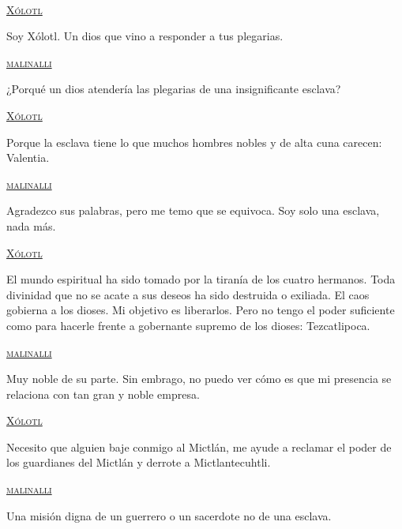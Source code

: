 \begin{center}
\\	
	\par
\textsc{\underline{Xólotl}}
\\	
	\par
Soy Xólotl. Un dios que vino a responder a tus plegarias.
\\	
	\par
\textsc{\underline{malinalli}}
\\	
	\par
¿Porqué un dios atendería las plegarias de una insignificante esclava?
\\	
	\par
\textsc{\underline{Xólotl}}
\\	
	\par
Porque la esclava tiene lo que muchos hombres nobles y de alta cuna carecen: Valentia. 
\\	
	\par
\textsc{\underline{malinalli}}
\\	
	\par
Agradezco sus palabras, pero me temo que se equivoca. Soy solo una esclava, nada más.
\\	
	\par
\textsc{\underline{Xólotl}}
\\	
	\par
El mundo espiritual ha sido tomado por la tiranía de los cuatro hermanos. Toda divinidad que no se acate a sus deseos ha sido destruida o exiliada. El caos gobierna a los dioses. Mi objetivo es liberarlos. Pero no tengo el poder suficiente como para hacerle frente a gobernante supremo de los dioses: Tezcatlipoca.
\\	
	\par
\textsc{\underline{malinalli}}
\\	
	\par
Muy noble de su parte. Sin embrago, no puedo ver cómo es que mi presencia se relaciona con tan gran y noble empresa.
\\	
	\par
\textsc{\underline{Xólotl}}
\\	
	\par
Necesito que alguien baje conmigo al Mictlán, me ayude a reclamar el poder de los guardianes del Mictlán y derrote a Mictlantecuhtli.
\\	
	\par
\textsc{\underline{malinalli}}
\\	
	\par
Una misión digna de un guerrero o un sacerdote no de una esclava.

\end{center}
